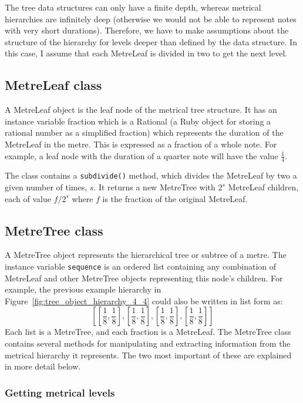 \documentclass[12pt,twoside,openright]{report}
\begin{document}
The tree data structures can only have a finite depth, whereas metrical hierarchies are infinitely deep (otherwise we would not be able to represent notes with very short durations). Therefore, we have to make assumptions about the structure of the hierarchy for levels deeper than defined by the data structure. In this case, I assume that each MetreLeaf is divided in two to get the next level.


\subsection{MetreLeaf class} \label{metreleaf}

A MetreLeaf object is the leaf node of the metrical tree structure. It has an
instance variable fraction which is a Rational (a Ruby object for storing a
rational number as a simplified fraction) which represents the duration of the
MetreLeaf in the metre. This is expressed as a fraction of a whole note. For
example, a leaf node with the duration of a quarter note will have the value $\frac{1}{4}$.

The class contains a \verb'subdivide()' method, which divides the MetreLeaf by two a
given number of times, $s$. It returns a new MetreTree with $2^s$ MetreLeaf children, each of value $f/2^s$ where $f$ is the fraction of the original MetreLeaf.


\subsection{MetreTree class} \label{metretree}

A MetreTree object represents the hierarchical tree or subtree of a metre. The
instance variable \verb'sequence' is an ordered list containing any combination of
MetreLeaf and other MetreTree objects representing this node's children. For
example, the previous example hierarchy in Figure~\ref{fig:tree_object_hierarchy_4_4} could also be written in list form as:
\[\left[\left[\frac{1}{8},\frac{1}{8}\right],\left[\frac{1}{8},\frac{1}{8}\right],\left[\frac{1}{8},\frac{1}{8}\right],\left[\frac{1}{8},\frac{1}{8}\right]\right]\]
Each list is a
MetreTree, and each fraction is a MetreLeaf. The MetreTree class contains
several methods for manipulating and extracting information from the metrical
hierarchy it represents. The two most important of these are explained in more
detail below.

\subsubsection{Getting metrical levels} \label{get_level}
\end{document}
